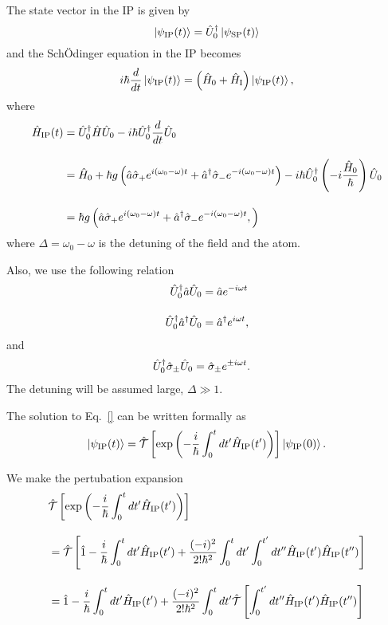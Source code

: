 The state vector in the IP is given by
\begin{equation}
    \ket{\psi_{\rm{IP}}(t)}
    =\hat{U}_0^\dagger\ket{\psi_{\rm{SP}}(t)}
\end{equation}
and the Sch\"{O}dinger equation in the IP becomes
\begin{equation}
    i\hbar\frac{d}{dt}\ket{\psi_{\rm{IP}}(t)}
    =\left(
    \hat{H}_0+\hat{H}_{\rm{I}}
    \right)
    \ket{\psi_{\rm{IP}}(t)},
\end{equation}
where
\begin{align}
    \hat{H}_{\rm{IP}}(t)
    &={\hat{U}}_0^\dagger\hat{H}{\hat{U}}_0
    -i\hbar\hat{U}_0^\dagger\frac{d}{dt}{\hat{U}}_0\\[10pt]
    &=\hat{H}_0 + \hbar g \left(
    \hat{a}{\hat{\sigma}}_+e^{i(\omega_0-\omega)t}
    +\hat{a}^\dagger{\hat{\sigma}}_-e^{-i(\omega_0-\omega)t}
    \right)
    -i\hbar\hat{U}_0^\dagger\left(
    -i\frac{\hat{H}_0}{\hbar}
    \right){\hat{U}}_0\\[10pt]
    &=\hbar g \left(
    \hat{a}{\hat{\sigma}}_+e^{i(\omega_0-\omega)t}
    +\hat{a}^\dagger{\hat{\sigma}}_-e^{-i(\omega_0-\omega)t},
    \right)
\end{align}
where $\Delta=\omega_0-\omega$ is the detuning of the field and the atom.

Also, we use the following relation
\begin{align}
    {\hat{U}}^{\dagger}_0\hat{a}{\hat{U}}_0&=\hat{a}e^{-i\omega t}\\[10pt]
    {\hat{U}}^{\dagger}_0\hat{a}^{\dagger}{\hat{U}}_0&=\hat{a}^{\dagger}e^{i\omega t},
\end{align}
and 
\begin{align}
    {\hat{U}}^{\dagger}_0\hat{\sigma}_{\pm}{\hat{U}}_0&=\hat{\sigma}_{\pm}e^{\pm i\omega t}.
\end{align}
The detuning will be assumed large, $\Delta \gg 1$.

The solution to Eq.~\eqref{} can be written formally as
\begin{equation}
    \ket{\psi_{\rm{IP}}(t)}=
    \hat{\mathcal{T}}\left[
    \exp{\left(
    -\frac{i}{\hbar}\int_0^t dt^\prime \hat{H}_{\rm{IP}}(t^\prime)
    \right)}
    \right]\ket{\psi_{\rm{IP}}(0)}.
\end{equation}

We make the pertubation expansion
\begin{align}\label{Tevol}
    &\hat{\mathcal{T}}\left[
    \exp{\left(
    -\frac{i}{\hbar}\int_0^t dt^\prime \hat{H}_{\rm{IP}}(t^\prime)
    \right)}
    \right]\nn[10pt]
    &=\hat{\mathcal{T}}\left[
    \hat{1}-\frac{i}{\hbar}\int_0^{t}dt^\prime \hat{H}_{\rm{IP}}(t^\prime)
    +\frac{(-i)^2}{2!\hbar^2}\int_0^{t}dt^\prime 
    \int_0^{t^\prime}dt^{\prime\prime} \hat{H}_{\rm{IP}}(t^\prime)\hat{H}_{\rm{IP}}(t^{\prime\prime})
    \right]\nn[10pt]
    &=
    \hat{1}-\frac{i}{\hbar}\int_0^{t}dt^\prime \hat{H}_{\rm{IP}}(t^\prime)
    +\frac{(-i)^2}{2!\hbar^2}\int_0^{t}dt^\prime
    \hat{\mathcal{T}}\left[
    \int_0^{t^\prime}dt^{\prime\prime} \hat{H}_{\rm{IP}}(t^\prime)\hat{H}_{\rm{IP}}(t^{\prime\prime})
    \right]
\end{align}


